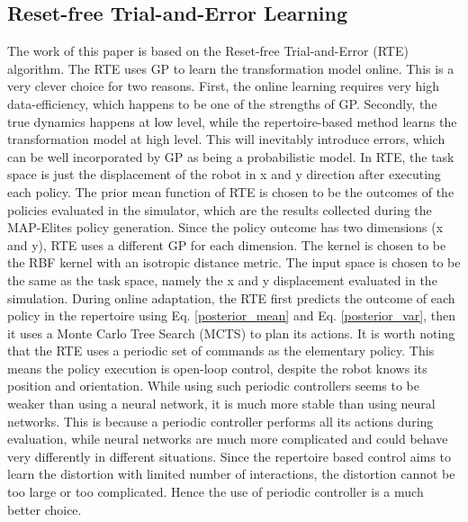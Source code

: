 \documentclass[journal]{IEEEtran}
\begin{document}
\subsection{Reset-free Trial-and-Error Learning}
The work of this paper is based on the Reset-free Trial-and-Error \cite{RTE} (RTE) algorithm. 
The RTE uses GP to learn the transformation model online.
This is a very clever choice for two reasons.
First, the online learning requires very high data-efficiency, which happens to be one of the strengths of GP. 
Secondly, the true dynamics happens at low level, while the repertoire-based method learns the transformation model at high level. This will inevitably introduce errors, which can be well incorporated by GP as being a probabilistic model.
In RTE, the task space is just the displacement of the robot in x and y direction after executing each policy.
The prior mean function of RTE is chosen to be the outcomes of the policies evaluated in the simulator, which are the results collected during the MAP-Elites policy generation. 
Since the policy outcome has two dimensions (x and y), RTE uses a different GP for each dimension.
The kernel is chosen to be the RBF kernel with an isotropic distance metric. The input space is chosen to be the same as the task space, namely the x and y displacement evaluated in the simulation. 
During online adaptation, the RTE first predicts the outcome of each policy in the repertoire using Eq. \ref{posterior_mean} and Eq. \ref{posterior_var}, then it uses a Monte Carlo Tree Search \cite{MCTS} (MCTS) to plan its actions.
It is worth noting that the RTE uses a periodic set of commands as the elementary policy. 
This means the policy execution is open-loop control, despite the robot knows its position and orientation.
While using such periodic controllers seems to be weaker than using a neural network, it is much more stable than using neural networks. 
This is because a periodic controller performs all its actions during evaluation, while neural networks are much more complicated and could behave very differently in different situations.
Since the repertoire based control aims to learn the distortion with limited number of interactions, the distortion cannot be too large or too complicated. Hence the use of periodic controller is a much better choice. 
\end{document}
